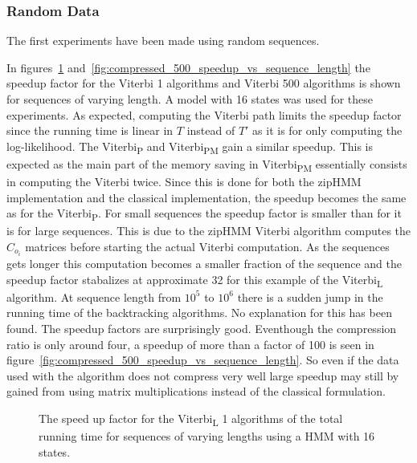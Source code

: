 \subsubsection{Random Data}

The first experiments have been made using random sequences.

In figures~\ref{fig:compressed_1_speedup_vs_sequence_length}
and~\ref{fig:compressed_500_speedup_vs_sequence_length} the speedup factor for
the Viterbi 1 algorithms and Viterbi 500 algorithms is shown for sequences of
varying length. A model with 16 states was used for these experiments. As
expected, computing the Viterbi path limits the speedup factor since the
running time is linear in $T$ instead of $T'$ as it is for only computing the
log-likelihood. The Viterbi\textsubscript{P} and Viterbi\textsubscript{PM} gain
a similar speedup. This is expected as the main part of the memory saving in
Viterbi\textsubscript{PM} essentially consists in computing the Viterbi twice.
Since this is done for both the zipHMM implementation and the classical
implementation, the speedup becomes the same as for the
Viterbi\textsubscript{P}. For small sequences the speedup factor is smaller
than for it is for large sequences. This is due to the zipHMM Viterbi
algorithm computes the $C_{o_i}$ matrices before starting the actual Viterbi
computation. As the sequences gets longer this computation becomes a smaller
fraction of the sequence and the speedup factor stabalizes at approximate 32
for this example of the Viterbi\textsubscript{L} algorithm. At sequence length
from $10^5$ to $10^6$ there is a sudden jump in the running time of the
backtracking algorithms. No explanation for this has been found.  The speedup factors are surprisingly good. Eventhough the
compression ratio is only around four, a speedup of more than a factor of 100
is seen in figure~\ref{fig:compressed_500_speedup_vs_sequence_length}. So even
if the data used with the algorithm does not compress very well large speedup
may still by gained from using matrix multiplications instead of the classical
formulation.

\begin{figure}
  \centering
  
  \caption{The speed up factor for the Viterbi\textsubscript{L} 1 algorithms of the total
    running time for sequences of varying lengths using
    a HMM with 16 states.}
  \label{fig:compressed_1_speedup_vs_sequence_length}
\end{figure}

